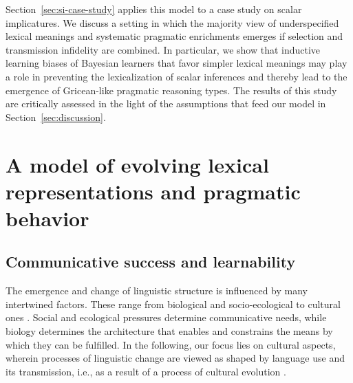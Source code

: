 \documentclass[a4paper, 11pt]{article}
\theoremstyle{Satz}
\begin{document}
Section~\ref{sec:si-case-study} applies this model to a case study on scalar implicatures. We
discuss a setting in which the majority view of underspecified lexical meanings and systematic pragmatic
enrichments emerges if selection and transmission infidelity are combined. In particular, we
show that inductive learning biases of Bayesian learners that favor simpler lexical meanings
may play a role in preventing the lexicalization of scalar inferences and thereby lead to the emergence of Gricean-like
pragmatic reasoning types. The results of this study are critically assessed in the light of
the assumptions that feed our model in Section~\ref{sec:discussion}.


\section{A model of evolving lexical representations and pragmatic behavior}
\label{sec:model}

\subsection{Communicative success and learnability}

The emergence and change of linguistic structure is influenced by many intertwined
factors. These range from biological and socio-ecological to cultural ones \citep{benz+etal:2005b,steels:2011,tamariz+kirby:2016}. Social and ecological pressures determine communicative needs, while
biology determines the architecture that enables and constrains the means by which they can be
fulfilled. In the following, our focus lies on cultural aspects, wherein processes of
linguistic change are viewed as shaped by language use and its transmission, i.e., as a result
of a process of cultural evolution
\citep{Pagel2009:Human-Language-,ThompsonKirby2016:Culture-Shapes-}.
\end{document}
